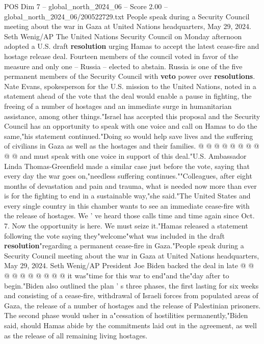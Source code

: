 \begin{textsample}{POS Dim 7 – global\_north\_2024\_06 – Score 2.00 – global\_north\_2024\_06/200522729.txt}  \label{ex:f7_pos_311}
People speak during a Security Council meeting about the war in Gaza at United Nations headquarters, May 29, 2024.
Seth Wenig/AP The United Nations Security Council on Monday afternoon adopted a U.S. draft \textbf{resolution} urging Hamas to accept the latest cease-fire and hostage release deal.
Fourteen members of the council voted in favor of the measure and only one -- Russia -- elected to abstain.
Russia is one of the five permanent members of the Security Council with \textbf{veto} power over \textbf{resolutions}.
Nate Evans, spokesperson for the U.S. mission to the United Nations, noted in a statement ahead of the vote that the deal would enable a pause in fighting, the freeing of a number of hostages and an immediate surge in humanitarian assistance, among other things."Israel has accepted this proposal and the Security Council has an opportunity to speak with one voice and call on Hamas to do the same,"his statement continued."Doing so would help save lives and the suffering of civilians in Gaza as well as the hostages and their families. @ @ @ @ @ @ @ @ @ @ and must speak with one voice in support of this deal."U.S.
Ambassador Linda Thomas-Greenfield made a similar case just before the vote, saying that every day the war goes on,"needless suffering continues.""Colleagues, after eight months of devastation and pain and trauma, what is needed now more than ever is for the fighting to end in a sustainable way,"she said."The United States and every single country in this chamber wants to see an immediate cease-fire with the release of hostages.
We ' ve heard those calls time and time again since Oct. 7.
Now the opportunity is here.
We must seize it."Hamas released a statement following the vote saying they"welcome"what was included in the draft \textbf{resolution}"regarding a permanent cease-fire in Gaza."People speak during a Security Council meeting about the war in Gaza at United Nations headquarters, May 29, 2024.
Seth Wenig/AP President Joe Biden backed the deal in late @ @ @ @ @ @ @ @ @ @ it was"time for this war to end"and the"day after to begin."Biden also outlined the plan ' s three phases, the first lasting for six weeks and consisting of a cease-fire, withdrawal of Israeli forces from populated areas of Gaza, the release of a number of hostages and the release of Palestinian prisoners.
The second phase would usher in a"cessation of hostilities permanently,"Biden said, should Hamas abide by the commitments laid out in the agreement, as well as the release of all remaining living hostages.

\end{textsample}
